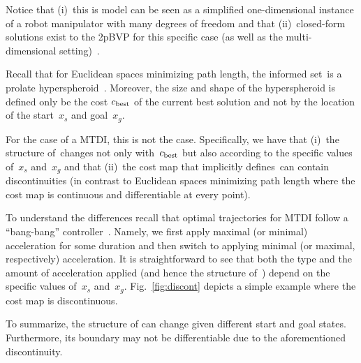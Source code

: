 \documentclass[letterpaper, 10 pt, conference]{ieeeconf}  %
\begin{document}
Notice that 
(i)~this is model can be seen as a simplified one-dimensional instance of a robot manipulator with many degrees of freedom and that
(ii)~closed-form solutions exist to the 2pBVP for this specific case (as well as the multi-dimensional setting)~\cite{HN10, KS14}.

Recall that for Euclidean spaces minimizing path length, the informed set~\Cinf is a prolate hyperspheroid~\cite{GSB14}.
Moreover, the size and shape of the hyperspheroid is defined only be the cost $c_{\rm best}$ of the current best solution and not by the location of the start~$x_s$ and goal~$x_g$.

For the case of a MTDI, this is not the case. 
Specifically, we have that 
(i)~the structure of~\Cinf changes not only with~$c_{\rm best}$ but also according to the specific values of~$x_s$ and~$x_g$ 
and that
(ii)~the cost map that implicitly defines~\Cinf can contain discontinuities (in contrast to Euclidean spaces minimizing path length where the cost map is continuous and differentiable at every point).

To understand the differences recall that optimal trajectories  for MTDI follow a ``bang-bang'' controller~\cite{HN10, KS14}.
Namely, we first apply maximal (or minimal) acceleration for some duration and then switch to applying minimal (or maximal, respectively) acceleration.
It is straightforward to see that both the type and the amount of acceleration applied (and hence the structure of~\Cinf) depend on the specific values of~$x_s$ and~$x_g$. 
Fig.~\ref{fig:discont} depicts a simple example where the cost map is discontinuous.

To summarize, the structure of \Cinf can change given different start and goal states.
Furthermore,  its boundary may not be  differentiable due to the aforementioned discontinuity.
\end{document}
